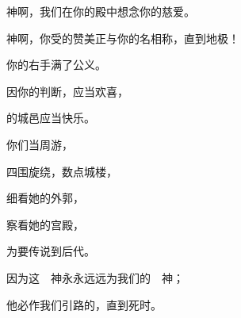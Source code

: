 {\BB \par }{\Q {}神啊，我们在你的殿中想念你的慈爱。
\par }{\Q {}神啊，你受的赞美正与你的名相称，直到地极！
\par }{\Q 你的右手满了公义。
\par }{\Q {}因你的判断，{}应当欢喜，
\par }{的城邑应当快乐。
\par }{\BB \par }{\Q {}你们当周游{}，
\par }{\Q 四围旋绕，数点城楼，
\par }{\Q {}细看她的外郭，
\par }{\Q 察看她的宫殿，
\par }{\Q 为要传说到后代。
\par }{\Q {}因为这　神永永远远为我们的　神；
\par }{\Q 他必作我们引路的，直到死时。

}

